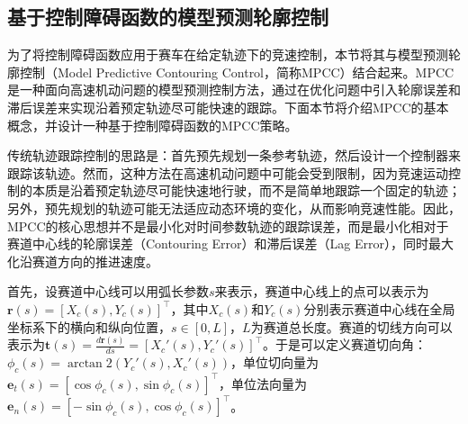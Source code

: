 \subsection{基于控制障碍函数的模型预测轮廓控制}
为了将控制障碍函数应用于赛车在给定轨迹下的竞速控制，本节将其与模型预测轮廓控制（Model Predictive Contouring Control，简称MPCC）结合起来。MPCC是一种面向高速机动问题的模型预测控制方法，通过在优化问题中引入轮廓误差和滞后误差来实现沿着预定轨迹尽可能快速的跟踪\cite{liniger2015optimization, romero2022model, brito2019model}。下面本节将介绍MPCC的基本概念，并设计一种基于控制障碍函数的MPCC策略。

传统轨迹跟踪控制的思路是：首先预先规划一条参考轨迹，然后设计一个控制器来跟踪该轨迹。然而，这种方法在高速机动问题中可能会受到限制，因为竞速运动控制的本质是沿着预定轨迹尽可能快速地行驶，而不是简单地跟踪一个固定的轨迹；另外，预先规划的轨迹可能无法适应动态环境的变化，从而影响竞速性能。因此，MPCC的核心思想并不是最小化对时间参数轨迹的跟踪误差，而是最小化相对于赛道中心线的轮廓误差（Contouring Error）和滞后误差（Lag Error），同时最大化沿赛道方向的推进速度。

首先，设赛道中心线可以用弧长参数$s$来表示，赛道中心线上的点可以表示为$\boldsymbol{r}(s)=[X_c(s), Y_c(s)]^\top$，其中$X_c(s)$和$Y_c(s)$分别表示赛道中心线在全局坐标系下的横向和纵向位置，$s\in[0, L]$，$L$为赛道总长度。赛道的切线方向可以表示为$\boldsymbol{t}(s)=\frac{d \boldsymbol{r}(s)}{ds}=[X_c'(s), Y_c'(s)]^\top$。于是可以定义赛道切向角：$\phi_c(s) = \arctan2(Y_c'(s), X_c'(s))$，单位切向量为$\boldsymbol{e}_t(s)=[\cos{\phi_c(s)}, \sin{\phi_c(s)}]^\top$，单位法向量为$\boldsymbol{e}_n(s)=[-\sin{\phi_c(s)}, \cos{\phi_c(s)}]^\top$。

